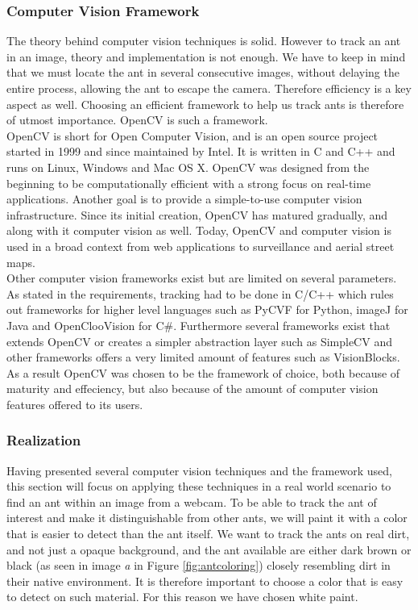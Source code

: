 \subsubsection{Computer Vision Framework} \mbox{}\par
\label{framework}
The theory behind computer vision techniques is solid. However to track an ant in an image, theory and implementation is not enough. We have to keep in mind that we must locate the ant in several consecutive images, without delaying the entire process, allowing the ant to escape the camera. Therefore efficiency is a key aspect as well. Choosing an efficient framework to help us track ants is therefore of utmost importance. OpenCV is such a framework.\\

OpenCV is short for Open Computer Vision, and is an open source project started in 1999 and since maintained by Intel. It is written in C and C++ and runs on Linux, Windows and Mac OS X. OpenCV was designed from the beginning to be computationally efficient with a strong focus on real-time applications. Another goal is to provide a simple-to-use computer vision infrastructure. Since its initial creation, OpenCV has matured gradually, and along with it computer vision as well. Today, OpenCV and computer vision is used in a broad context from web applications to surveillance and aerial street maps.\\

Other computer vision frameworks exist but are limited on several parameters. As stated in the requirements, tracking had to be done in C/C++ which rules out frameworks for higher level languages such as PyCVF for Python, imageJ for Java and OpenClooVision for C\#. Furthermore several frameworks exist that extends OpenCV or creates a simpler abstraction layer such as SimpleCV and other frameworks offers a very limited amount of features such as VisionBlocks. As a result OpenCV was chosen to be the framework of choice, both because of maturity and effeciency, but also because of the amount of computer vision features offered to its users.

\subsubsection{Realization} \mbox{}\par
Having presented several computer vision techniques and the framework used, this section will focus on applying these techniques in a real world scenario to find an ant within an image from a webcam. To be able to track the ant of interest and make it distinguishable from other ants, we will paint it with a color that is easier to detect than the ant itself. We want to track the ants on real dirt, and not just a opaque background, and the ant available are either dark brown or black (as seen in image \emph{a} in Figure \ref{fig:antcoloring}) closely resembling dirt in their native environment. It is therefore important to choose a color that is easy to detect on such material. For this reason we have chosen white paint.\\

